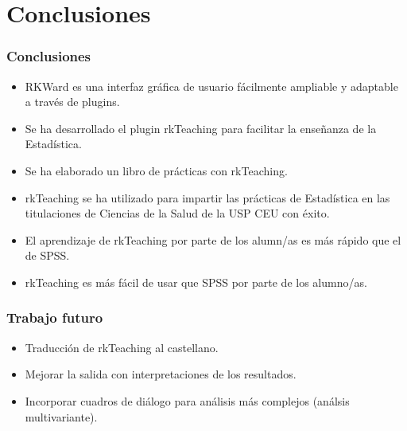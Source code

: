 \documentclass[mathserif,profesionalfont,10pt,dvips,xcolor=table]{beamer}
\theoremstyle{definition}
\begin{document}

\section{Conclusiones}

\begin{frame}
\frametitle<presentation>{Conclusiones}
\begin{itemize}
\item RKWard es una interfaz gráfica de usuario fácilmente ampliable y adaptable a través de plugins.
\item Se ha desarrollado el plugin rkTeaching para facilitar la enseñanza de la Estadística.
\item Se ha elaborado un libro de prácticas con rkTeaching.
\item rkTeaching se ha utilizado para impartir las prácticas de Estadística en las titulaciones de Ciencias de la Salud de la USP CEU con éxito. 
\item El aprendizaje de rkTeaching por parte de los alumn/as es más rápido que el de SPSS.
\item rkTeaching es más fácil de usar que SPSS por parte de los alumno/as.   
\end{itemize}
\end{frame}

\begin{frame}
\frametitle{Trabajo futuro}
\begin{itemize}
\item Traducción de rkTeaching al castellano. 
\item Mejorar la salida con interpretaciones de los resultados. 
\item Incorporar cuadros de diálogo para análisis más complejos (análsis multivariante).
\end{itemize}
\end{frame}
\end{document}
